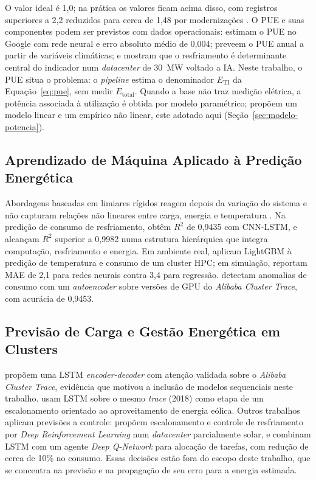 \documentclass[a4paper,12pt]{article}
\begin{document}
\noindent O valor ideal é 1,0; na prática os valores ficam acima disso, com registros superiores a 2,2 reduzidos para cerca de 1,48 por modernizações \cite{song2026}. O PUE e suas componentes podem ser previstos com dados operacionais:  estimam o PUE no Google com rede neural e erro absoluto médio de 0,004;  preveem o PUE anual a partir de variáveis climáticas; e  mostram que o resfriamento é determinante central do indicador num \textit{datacenter} de 30~MW voltado a IA. Neste trabalho, o PUE situa o problema: o \textit{pipeline} estima o denominador $E_{\mathrm{TI}}$ da Equação~\eqref{eq:pue}, sem medir $E_{\mathrm{total}}$. Quando a base não traz medição elétrica, a potência associada à utilização é obtida por modelo paramétrico;  propõem um modelo linear e um empírico não linear, este adotado aqui (Seção~\ref{sec:modelo-potencia}).

\subsection{Aprendizado de Máquina Aplicado à Predição Energética}

Abordagens baseadas em limiares rígidos reagem depois da variação do sistema e não capturam relações não lineares entre carga, energia e temperatura \cite{kahil2025,gao2014}. Na predição de consumo de resfriamento,  obtêm $R^2$ de 0,9435 com CNN-LSTM, e  alcançam $R^2$ superior a 0,9982 numa estrutura hierárquica que integra computação, resfriamento e energia. Em ambiente real,  aplicam LightGBM à predição de temperatura e consumo de um cluster HPC; em simulação,  reportam MAE de 2,1 para redes neurais contra 3,4 para regressão.  detectam anomalias de consumo com um \textit{autoencoder} sobre versões de GPU do \textit{Alibaba Cluster Trace}, com acurácia de 0,9453.

\subsection{Previsão de Carga e Gestão Energética em Clusters}

 propõem uma LSTM \textit{encoder-decoder} com atenção validada sobre o \textit{Alibaba Cluster Trace}, evidência que motivou a inclusão de modelos sequenciais neste trabalho.  usam LSTM sobre o mesmo \textit{trace} (2018) como etapa de um escalonamento orientado ao aproveitamento de energia eólica. Outros trabalhos aplicam previsões a controle:  propõem escalonamento e controle de resfriamento por \textit{Deep Reinforcement Learning} num \textit{datacenter} parcialmente solar, e  combinam LSTM com um agente \textit{Deep Q-Network} para alocação de tarefas, com redução de cerca de 10\% no consumo. Essas decisões estão fora do escopo deste trabalho, que se concentra na previsão e na propagação de seu erro para a energia estimada.
\end{document}
